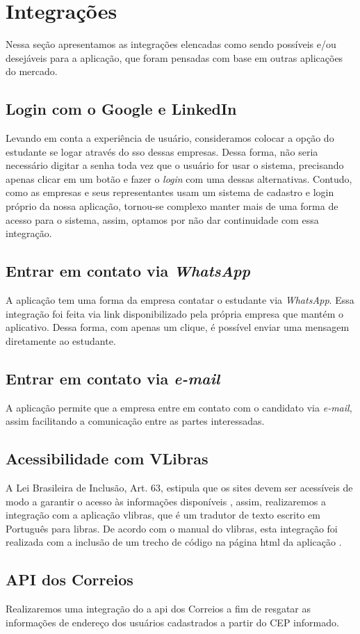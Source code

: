 \section{Integrações}
Nessa seção apresentamos as integrações elencadas como sendo possíveis e/ou desejáveis para a aplicação, que foram pensadas com base em outras aplicações do mercado.

\subsection{Login com o Google e LinkedIn}
Levando em conta a experiência de usuário, consideramos colocar a opção do estudante se logar através do \ac{sso} dessas empresas. Dessa forma, não seria necessário digitar a senha toda vez que o usuário for usar o sistema, precisando apenas clicar em um botão e fazer o \textit{login} com uma dessas alternativas. Contudo, como as empresas e seus representantes usam um sistema de cadastro e login próprio da nossa aplicação, tornou-se complexo manter mais de uma forma de acesso para o sistema, assim, optamos por não dar continuidade com essa integração.

\subsection{Entrar em contato via \textit{WhatsApp}}
A aplicação tem uma forma da empresa contatar o estudante via \textit{WhatsApp}. Essa integração foi feita via link disponibilizado pela própria empresa que mantém o aplicativo. Dessa forma, com apenas um clique, é possível enviar uma mensagem diretamente ao estudante.

\subsection{Entrar em contato via \textit{e-mail}}
A aplicação permite que a empresa entre em contato com o candidato via \textit{e-mail}, assim facilitando a comunicação entre as partes interessadas.

\subsection{Acessibilidade com VLibras}
A Lei Brasileira de Inclusão, Art. 63, estipula que os sites devem ser acessíveis de modo a garantir o acesso às informações disponíveis \cite{leiinclusao}, assim, realizaremos a integração com a aplicação \gls{vlibras}, que é um tradutor de texto escrito em Português para \ac{libras}. De acordo com o manual do \gls{vlibras}, esta integração foi realizada com a inclusão de um trecho de código na página \ac{html} da aplicação \cite{manualvlibras}.

\subsection{API dos Correios}
Realizaremos uma integração do a \ac{api} dos Correios a fim de resgatar as informações de endereço dos usuários cadastrados a partir do CEP informado.